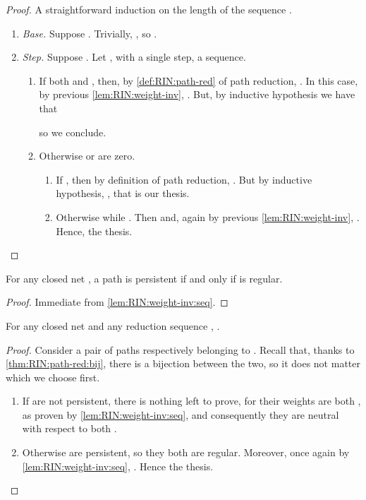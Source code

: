 \begin{example}
\begin{proof}
A straightforward induction on the length  of the sequence .
\begin{enumerate}
\item \textit{Base.}
  Suppose .
  Trivially, , so .
\item \textit{Step.}
  Suppose .
  Let , with 
     a single step,
     a sequence.
  \begin{enumerate}
  \item If both  and , then, by 
    \autoref{def:RIN:path-red} of path reduction, 
    .
    In this case, by previous \autoref{lem:RIN:weight-inv},
    .
    But, by inductive hypothesis we have that
     
    so we conclude.
  \item Otherwise  or  are zero.
    \begin{enumerate}
    \item If , then by definition of path 
      reduction, .
      But by inductive hypothesis, , that is our 
      thesis.
    \item Otherwise  while .
      Then  and, again by previous \autoref{lem:RIN:weight-inv}, 
      .
      Hence, the thesis.
    \end{enumerate}
\end{enumerate}
\end{enumerate}
\end{proof}

\begin{theorem}
\label{thm:RIN:regular}
For any closed net , a path  is 
persistent if and only if  is regular.
\end{theorem}
\begin{proof}
  Immediate from \autoref{lem:RIN:weight-inv:seq}.
\end{proof}

\begin{theorem}
\label{thm:RIN:weight-inv}
For any closed net  and any reduction sequence
, .
\end{theorem}

\begin{proof}
  Consider a pair  of paths respectively belonging to 
  .
  Recall that, thanks to \autoref{thm:RIN:path-red:bij},
  there is a bijection between the two, so it does not matter which we choose 
  first.
  \begin{enumerate}
  \item
    If  are not persistent, there is nothing left to prove, 
    for their weights are both , as proven
    by \autoref{lem:RIN:weight-inv:seq},
    and consequently they are neutral with respect to both
    .
  \item
    Otherwise  are persistent,
    so they both are regular.
    Moreover, once again by \autoref{lem:RIN:weight-inv:seq},
    .
    Hence the thesis.
  \end{enumerate}
\vspace{-1.5em}
\end{proof}


\end{example}
